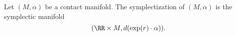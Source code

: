 
 
    \label{def:symplectization}
    Let $(M, \alpha)$ be a contact manifold. The symplectization of $(M, \alpha)$ is the symplectic manifold
    \[(\RR\times M, d(\exp(r)\cdot \alpha)).\]
 